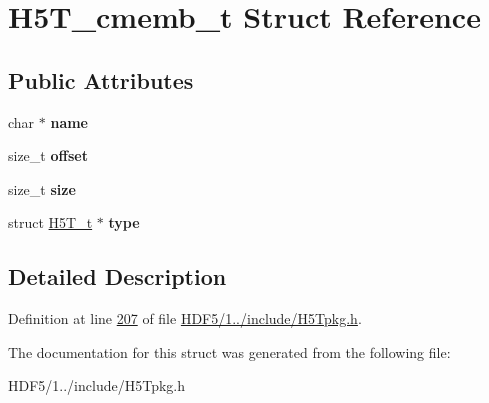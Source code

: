 \hypertarget{struct_h5_t__cmemb__t}{}\section{H5\+T\+\_\+cmemb\+\_\+t Struct Reference}
\label{struct_h5_t__cmemb__t}
\subsection*{Public Attributes}
\begin{DoxyCompactItemize}
\item 
\mbox{\label{struct_h5_t__cmemb__t_a9f31a21949d02ea78e6eb2cb6547083e}} 
char $\ast$ {\bfseries name}
\item 
\mbox{\label{struct_h5_t__cmemb__t_a2211d5944b0faa11b04b54839cfd03ed}} 
size\+\_\+t {\bfseries offset}
\item 
\mbox{\label{struct_h5_t__cmemb__t_aa4289185ab80f509935e5a8d424d2e5f}} 
size\+\_\+t {\bfseries size}
\item 
\mbox{\label{struct_h5_t__cmemb__t_a0d7c6328e8ecdca113ab37cd170b43b3}} 
struct \hyperlink{struct_h5_t__t}{H5\+T\+\_\+t} $\ast$ {\bfseries type}
\end{DoxyCompactItemize}


\subsection{Detailed Description}


Definition at line \hyperlink{_h_d_f5_21_810_81_2include_2_h5_tpkg_8h_source_l00207}{207} of file \hyperlink{_h_d_f5_21_810_81_2include_2_h5_tpkg_8h_source}{H\+D\+F5/1../include/\+H5\+Tpkg.\+h}.



The documentation for this struct was generated from the following file\+:\begin{DoxyCompactItemize}
\item 
H\+D\+F5/1../include/\+H5\+Tpkg.\+h\end{DoxyCompactItemize}
